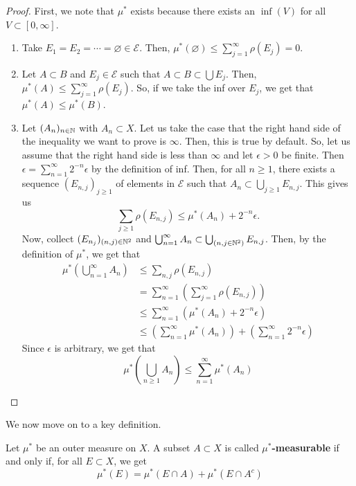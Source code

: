\documentclass[11pt,leqno,oneside]{amsbook}
\numberwithin{thm}{section}
\newcommand{\Ep}{\mathcal{E}} %
\renewcommand{\emptyset}{\varnothing}
\renewcommand{\de}{\textbf} %
\begin{document}
\begin{proof}
  First, we note that $\mu^*$ exists because there exists an $\inf(V)$
  for all $V \subset [0,\infty]$.
  \begin{enumerate}
  \item Take $E_1 = E_2 = \cdots = \emptyset \in \Ep$. Then,
    $\mu^*(\emptyset) \leq \sum_{j=1}^\infty \rho(E_j) = 0$.
  \item Let $A \subset B$ and $E_j \in \Ep$ such that $A \subset B
    \subset \bigcup E_j$. Then, $\mu^*(A) \leq \sum_{j=1}^\infty \rho
    (E_j)$. So, if we take the inf over $E_j$, we get that $\mu^*(A)
    \leq \mu^*(B)$.
  \item Let $(A_n)_{n \in {\mathbb N}}$ with $A_n \subset X$. Let us take the
    case that the right hand side of the inequality we want to prove
    is $\infty$. Then, this is true by default. So, let us assume that
    the right hand side is less than $\infty$ and let $\epsilon > 0$
    be finite. Then $\epsilon = \sum_{n=1}^\infty 2^{-n} \epsilon$ by
    the definition of inf. Then, for all $n \geq 1$, there exists a
    sequence $(E_{n,j})_{j \geq 1}$ of elements in $\Ep$ such that
    $A_n \subset \bigcup_{j \geq 1} E_{n,j}$. This gives us \[
      \sum_{j \geq 1} \rho(E_{n,j}) \leq \mu^*(A_n) + 2^{-n} \epsilon.
    \]
    Now, collect $(E_{n_j})_{(n,j) \in {\mathbb N}^2}$ and
    $\bigcup_{n=1}^\infty A_n \subset \bigcup_{(n,j \in
      {\mathbb N}^2)}E_{n,j}$. Then, by the definition of $\mu^*$, we get that
    \begin{align*}
      \mu^*\left( \bigcup_{n=1}^\infty A_n \right) & \leq \sum_{n,j}
                                                     \rho(E_{n,j}) \\
      & = \sum_{n = 1}^\infty \left( \sum_{j=1}^\infty \rho(E_{n,j})
        \right) \\
      & \leq \sum_{n=1}^\infty \left( \mu^*(A_n) + 2^{-n} \epsilon
        \right) \\
      & \leq \left( \sum_{n=1}^\infty \mu^*(A_n) \right) + \left(
        \sum_{n=1}^\infty 2^{-n} \epsilon \right)
    \end{align*}
    Since $\epsilon$ is arbitrary, we get that \[
      \mu^*\left( \bigcup_{n \geq 1} A_n \right) \leq
      \sum_{n=1}^\infty \mu^*(A_n)
    \]
  \end{enumerate}
\end{proof}
We now move on to a key definition.
\begin{defn}[Carathéodory]
  Let $\mu^*$ be an outer measure on $X$. A subset $A \subset X$ is
  called \de{$\mu^*$-measurable} if and only if, for all $E \subset
  X$, we get \[
    \mu^*(E) = \mu^*(E \cap A) + \mu^*(E \cap A^c)
  \]
\end{defn}
\end{document}
